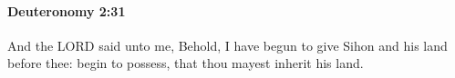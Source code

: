 
		\paragraph{Deuteronomy 2:31} %
			\label{DEUTERONOMY-2-31}

			And the LORD said unto me, Behold, I have begun to give Sihon and his land before thee: begin to possess, that thou mayest inherit his land.


